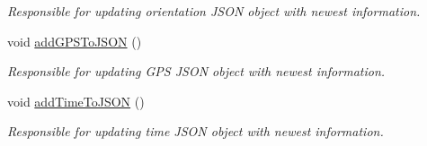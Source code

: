 \begin{DoxyCompactItemize}
\begin{DoxyCompactList}\small\item\em Responsible for updating orientation J\+S\+ON object with newest information. \end{DoxyCompactList}\item 
void \hyperlink{logging-device_8ino_af1705fad6a6282b24379a174e18d4fe4}{add\+G\+P\+S\+To\+J\+S\+ON} ()
\begin{DoxyCompactList}\small\item\em Responsible for updating G\+PS J\+S\+ON object with newest information. \end{DoxyCompactList}\item 
void \hyperlink{logging-device_8ino_a9e4931f452cd25dfff67d41e7c9c0efb}{add\+Time\+To\+J\+S\+ON} ()
\begin{DoxyCompactList}\small\item\em Responsible for updating time J\+S\+ON object with newest information. \end{DoxyCompactList}\end{DoxyCompactItemize}
